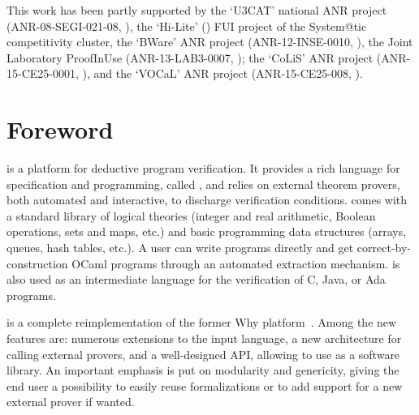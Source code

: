 \documentclass[a4paper,11pt,twoside,openright]{memoir}
\newcommand{\ahref}[2]{{#2}}
\newenvironment{latexonly}{}{}
\begin{document}
\begin{center}
\begin{flushleft}
This work has been partly supported by the `\ahref{\urlutcat}{U3CAT}'
national ANR project (ANR-08-SEGI-021-08\begin{latexonly},
  \urlutcat\end{latexonly}), the `\ahref{\urlhilite}{Hi-Lite}'
\begin{latexonly}(\urlhilite)\end{latexonly} FUI project of the
System@tic competitivity cluster, the `\ahref{\urlbware}{BWare}'
ANR project (ANR-12-INSE-0010\begin{latexonly},
  \urlbware\end{latexonly}), the \ahref{\urlproofinuse}{Joint Laboratory ProofInUse} (ANR-13-LAB3-0007\begin{latexonly}, \urlproofinuse\end{latexonly});
the `\ahref{\urlcolis}{CoLiS}' ANR project (ANR-15-CE25-0001\begin{latexonly},
  \urlcolis\end{latexonly}), and the `\ahref{\urlvocal}{VOCaL}' ANR project (ANR-15-CE25-008\begin{latexonly},
  \urlvocal\end{latexonly}).
\end{flushleft}
\end{center}

\chapter*{Foreword}

\why is a platform for deductive program verification. It provides
a rich language for specification and programming, called \whyml, and
relies on external theorem provers, both automated and interactive,
to discharge verification conditions. \why comes with a standard
library of logical theories (integer and real arithmetic, Boolean
operations, sets and maps, etc.) and basic programming data structures
(arrays, queues, hash tables, etc.). A user can write \whyml programs
directly and get correct-by-construction OCaml programs through an
automated extraction mechanism. \whyml is also used as an intermediate
language for the verification of C, Java, or Ada programs.

\why is a complete reimplementation %
of the former Why platform~\cite{filliatre07cav}.
Among the new features are: numerous
extensions to the input language, a new architecture for calling
external provers, and a well-designed API, allowing to use \why as a
software library.  An important emphasis is put on modularity and
genericity, giving the end user a possibility to easily reuse \why
formalizations or to add support for a new external prover if wanted.
\end{document}
